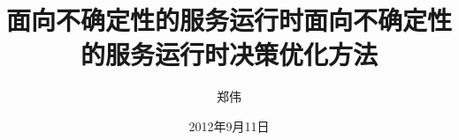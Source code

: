
\subject{计算机科学与技术}
\author{郑伟}
\date{2012年9月11日}

\ifxueweidoctor
  \title{面向不确定性的服务运行时} %
\fi
\ifxueweimaster
  \title{面向不确定性的服务运行时决策优化方法}
\fi

\makecover
\clearpage
\setcounter{page}{1}